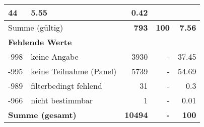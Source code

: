 \begin{longtable}{lXrrr}
       \num{44} &
       \num[round-mode=places,round-precision=2]{5,55} &
         \num[round-mode=places,round-precision=2]{0,42} \\
     \midrule
     \multicolumn{2}{l}{Summe (gültig)} &
       \textbf{\num{793}} &
     \textbf{100} &
       \textbf{\num[round-mode=places,round-precision=2]{7,56}} \\
     \multicolumn{5}{l}{\textbf{Fehlende Werte}}\\
       -998 &
       keine Angabe &
         \num{3930} &
        - &
         \num[round-mode=places,round-precision=2]{37,45} \\
       -995 &
       keine Teilnahme (Panel) &
         \num{5739} &
        - &
         \num[round-mode=places,round-precision=2]{54,69} \\
       -989 &
       filterbedingt fehlend &
         \num{31} &
        - &
         \num[round-mode=places,round-precision=2]{0,3} \\
       -966 &
       nicht bestimmbar &
         \num{1} &
        - &
         \num[round-mode=places,round-precision=2]{0,01} \\
     \midrule
     \multicolumn{2}{l}{\textbf{Summe (gesamt)}} &
          \textbf{\num{10494}} &
        \textbf{-} &
        \textbf{100} \\
     \bottomrule
     \end{longtable}
     
